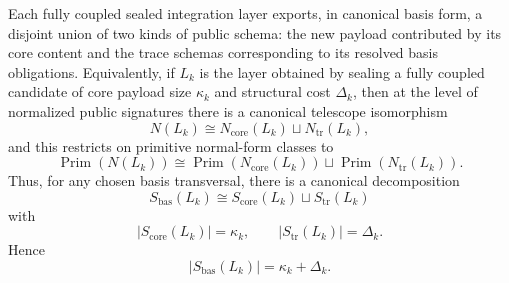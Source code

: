 \documentclass{lmcs}
\begin{document}
\begin{thm}
Each fully coupled sealed integration layer exports, in canonical basis form, a disjoint union
of two kinds of public schema: the new payload contributed by its core content and the trace
schemas corresponding to its resolved basis obligations.  Equivalently, if \(L_k\) is the layer
obtained by sealing a fully coupled candidate of core payload size \(\kappa_k\) and structural
cost \(\Delta_k\), then at the level of normalized public signatures there is a canonical
telescope isomorphism
\[
  N(L_k) \cong N_{\mathrm{core}}(L_k) \sqcup N_{\mathrm{tr}}(L_k),
\]
and this restricts on primitive normal-form classes to
\[
  \operatorname{Prim}(N(L_k))
  \cong
  \operatorname{Prim}(N_{\mathrm{core}}(L_k))
  \sqcup
  \operatorname{Prim}(N_{\mathrm{tr}}(L_k)).
\]
Thus, for any chosen basis transversal, there is a canonical decomposition
\[
  S_{\mathrm{bas}}(L_k) \cong S_{\mathrm{core}}(L_k) \sqcup S_{\mathrm{tr}}(L_k)
\]
with
\[
  |S_{\mathrm{core}}(L_k)|=\kappa_k,
  \qquad
  |S_{\mathrm{tr}}(L_k)|=\Delta_k.
\]
Hence
\[
  |S_{\mathrm{bas}}(L_k)|=\kappa_k+\Delta_k.
\]
\end{thm}
\end{document}
